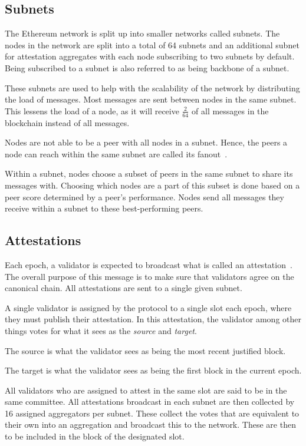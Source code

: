 \subsection{Subnets}\label{subsec:subnets}
The Ethereum network is split up into smaller networks called subnets.
The nodes in the network are split into a total of 64 subnets and an additional subnet for attestation aggregates with each node subscribing to two subnets by default.
Being subscribed to a subnet is also referred to as being backbone of a subnet.

These subnets are used to help with the scalability of the network by distributing the load of messages.
Most messages are sent between nodes in the same subnet.
This lessens the load of a node, as it will receive $\frac{2}{64}$ of all messages in the blockchain instead of all messages.


Nodes are not able to be a peer with all nodes in a subnet.
Hence, the peers a node can reach within the same subnet are called its fanout~\cite{heimbach2024deanonymizingethereumvalidatorsp2p}.

Within a subnet, nodes choose a subset of peers in the same subnet to share its messages with.
Choosing which nodes are a part of this subset is done based on a peer score determined by a peer's performance.
Nodes send all messages they receive within a subnet to these best-performing peers.

\subsection{Attestations}\label{subsec:attestations}
Each epoch, a validator is expected to broadcast what is called an attestation~\cite{attestations}.
The overall purpose of this message is to make sure that validators agree on the canonical chain.
All attestations are sent to a single given subnet.

A single validator is assigned by the protocol to a single slot each epoch, where they must publish their attestation.
In this attestation, the validator among other things votes for what it sees as the \textit{source} and \textit{target}.

The source is what the validator sees as being the most recent justified block.

The target is what the validator sees as being the first block in the current epoch.

All validators who are assigned to attest in the same slot are said to be in the same committee.
All attestations broadcast in each subnet are then collected by 16 assigned aggregators per subnet.
These collect the votes that are equivalent to their own into an aggregation and broadcast this to the network.
These are then to be included in the block of the designated slot.


